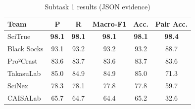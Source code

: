 \begin{table}[ht]
\centering
\small
\caption{Subtask 1 results (JSON evidence)}
\label{tab:subtask1_json}
\begin{tabular}{lccccc}
\toprule
Team & P & R & Macro-F1 & Acc. & Pair Acc. \\
\midrule
SciTrue & \textbf{98.1} & \textbf{98.1} & \textbf{98.1} & \textbf{98.1} & \textbf{98.4} \\
Black Socks & 93.1 & 93.2 & 93.2 & 93.2 & 88.7 \\
Pro²Crast & 83.6 & 83.7 & 83.6 & 83.7 & 83.6 \\
TakasuLab & 85.0 & 84.9 & 84.9 & 85.0 & 71.3 \\
SciNex & 78.3 & 78.1 & 77.8 & 77.8 & 59.7 \\
CAISALab & 65.7 & 64.7 & 64.4 & 65.2 & 32.6 \\
\bottomrule
\end{tabular}
\end{table}
